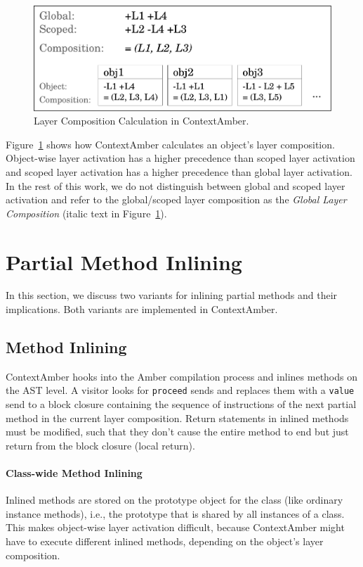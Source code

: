 \documentclass{sig-alternate}
\newcommand{\todo}[1]{{\color{red}[[TODO: {\emph{#1}}]]}}
\begin{document}
\begin{figure}[!htp]
    \includegraphics[width=\columnwidth]{layer_composition_calculation.pdf}
    \caption{Layer Composition Calculation in ContextAmber.}
    \label{fig:layer_composition_calculation}
\end{figure}

Figure~\ref{fig:layer_composition_calculation} shows how ContextAmber calculates an object's layer composition. Object-wise layer activation has a higher precedence than scoped layer activation and scoped layer activation has a higher precedence than global layer activation. In the rest of this work, we do not distinguish between global and scoped layer activation and refer to the global/scoped layer composition as the \emph{Global Layer Composition} (italic text in Figure~\ref{fig:layer_composition_calculation}).

\section{Partial Method Inlining}
\label{sec:inlining}
\label{sec:partial_method_inlining}
In this section, we discuss two variants for inlining partial methods and their implications. Both variants are implemented in ContextAmber.

\subsection{Method Inlining}
ContextAmber hooks into the Amber compilation process and inlines methods on the AST level. A visitor looks for \texttt{proceed} sends and replaces them with a \texttt{value} send to a block closure containing the sequence of instructions of the next partial method in the current layer composition. Return statements in inlined methods must be modified, such that they don't cause the entire method to end but just return from the block closure (local return). 

\paragraph{Class-wide Method Inlining}
Inlined methods are stored on the prototype object for the class (like ordinary instance methods), i.e., the prototype that is shared by all instances of a class. This makes object-wise layer activation difficult, because ContextAmber might have to execute different inlined methods, depending on the object's layer composition.
\end{document}

